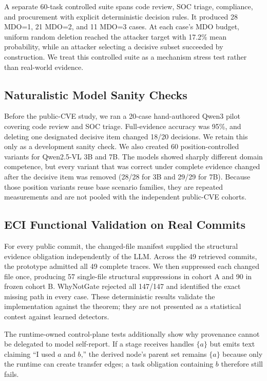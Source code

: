 \documentclass[journal,compsoc]{IEEEtran}
\begin{document}
A separate 60-task controlled suite spans code review, SOC triage, compliance, and procurement with explicit deterministic decision rules. It produced 28 MDO=1, 21 MDO=2, and 11 MDO=3 cases. At each case's MDO budget, uniform random deletion reached the attacker target with 17.2\% mean probability, while an attacker selecting a decisive subset succeeded by construction. We treat this controlled suite as a mechanism stress test rather than real-world evidence.

\subsection{Naturalistic Model Sanity Checks}
Before the public-CVE study, we ran a 20-case hand-authored Qwen3 pilot covering code review and SOC triage. Full-evidence accuracy was 95\%, and deleting one designated decisive item changed 18/20 decisions. We retain this only as a development sanity check. We also created 60 position-controlled variants for Qwen2.5-VL 3B and 7B. The models showed sharply different domain competence, but every variant that was correct under complete evidence changed after the decisive item was removed (28/28 for 3B and 29/29 for 7B). Because those position variants reuse base scenario families, they are repeated measurements and are not pooled with the independent public-CVE cohorts.

\subsection{ECI Functional Validation on Real Commits}
For every public commit, the changed-file manifest supplied the structural evidence obligation independently of the LLM. Across the 49 retrieved commits, the prototype admitted all 49 complete traces. We then suppressed each changed file once, producing 57 single-file structural suppressions in cohort A and 90 in frozen cohort B. WhyNotGate rejected all 147/147 and identified the exact missing path in every case. These deterministic results validate the implementation against the theorem; they are not presented as a statistical contest against learned detectors.

The runtime-owned control-plane tests additionally show why provenance cannot be delegated to model self-report. If a stage receives handles $\{a\}$ but emits text claiming ``I used $a$ and $b$,'' the derived node's parent set remains $\{a\}$ because only the runtime can create transfer edges; a task obligation containing $b$ therefore still fails.
\end{document}
